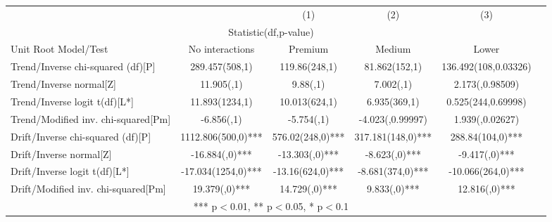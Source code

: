 \begin{tabular}{lccccc} \hline
	&& (1) & (2) & (3)\\
	\multicolumn{5}{c}{Statistic(df,p-value)}\\
	Unit Root Model/Test&No interactions&Premium&Medium&Lower&\\
	Trend/Inverse chi-squared (df)[P]&289.457(508,1)&119.86(248,1)&81.862(152,1)&136.492(108,0.03326)\\
	Trend/Inverse normal[Z]&11.905(,1)&9.88(,1)&7.002(,1)&2.173(,0.98509)\\
	Trend/Inverse logit t(df)[L*]&11.893(1234,1)&10.013(624,1)&6.935(369,1)&0.525(244,0.69998)\\
	Trend/Modified inv. chi-squared[Pm]&-6.856(,1)&-5.754(,1)&-4.023(,0.99997)&1.939(,0.02627)\\
	Drift/Inverse chi-squared (df)[P]&1112.806(500,0)***&576.02(248,0)***&317.181(148,0)***&288.84(104,0)***\\
	Drift/Inverse normal[Z]&-16.884(,0)***&-13.303(,0)***&-8.623(,0)***&-9.417(,0)***\\
	Drift/Inverse logit t(df)[L*]&-17.034(1254,0)***&-13.16(624,0)***&-8.681(374,0)***&-10.066(264,0)***\\
	Drift/Modified inv. chi-squared[Pm]&19.379(,0)***&14.729(,0)***&9.833(,0)***&12.816(,0)***\\
	\hline
	\multicolumn{5}{c}{ *** p$<$0.01, ** p$<$0.05, * p$<$0.1} \\
\end{tabular}
